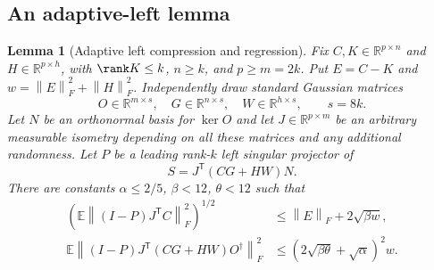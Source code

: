 \documentclass[11pt,oneside,openany,a4paper]{book}
\numberwithin{equation}{chapter}
\newtheorem{lemma}[theorem]{Lemma}
\theoremstyle{definition}
\theoremstyle{remark}
\newcommand{\R}{\mathbb R}\newcommand{\E}{\mathbb E}\newcommand{\Prb}{\mathbb P}\newcommand{\PP}{\mathbb P}
\newcommand{\T}{\mathsf T}\newcommand{\Id}{I}
\newcommand{\F}[1]{\left\lVert#1\right\rVert_F}
\begin{document}
\subsection{An adaptive-left lemma}
\begin{lemma}[Adaptive left compression and regression]\label{base:lem:adaptive-left}
Fix $C,K\in\R^{p\times n}$ and $H\in\R^{p\times h}$, with
$\rank K\le k$, $n\ge k$, and $p\ge m=2k$. Put $E=C-K$ and
$w=\F E^2+\F H^2$. Independently draw standard Gaussian matrices
\[
 O\in\R^{m\times s},\quad G\in\R^{n\times s},\quad
 W\in\R^{h\times s},\qquad s=8k.
\]
Let $N$ be an orthonormal basis for $\ker O$ and let
$J\in\R^{p\times m}$ be an arbitrary measurable isometry depending on all
these matrices and any additional randomness. Let $P$ be a leading rank-$k$
left singular projector of
\begin{equation}\label{base:eq:adaptive-left-sample}
 S=J^{\T}(CG+HW)N.
\end{equation}
There are constants $\alpha\le2/5$, $\beta<12$, $\theta<12$ such that
\begin{align}
 \left(\E\F{(I-P)J^{\T}C}^2\right)^{1/2}
       &\le\F E+2\sqrt{\beta w},\label{base:eq:adaptive-left-proj}\\
 \E\F{(I-P)J^{\T}(CG+HW)O^\dagger}^2
       &\le(2\sqrt{\beta\theta}+\sqrt\alpha)^2w.
                                                        \label{base:eq:adaptive-left-reg}
\end{align}
\end{lemma}
\end{document}
